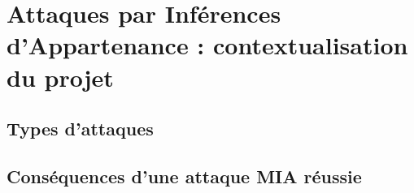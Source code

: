 \chapter{Attaques par Inférences d'Appartenance : contextualisation du projet}
    \section{Types d'attaques}

    \section{Conséquences d'une attaque MIA réussie}